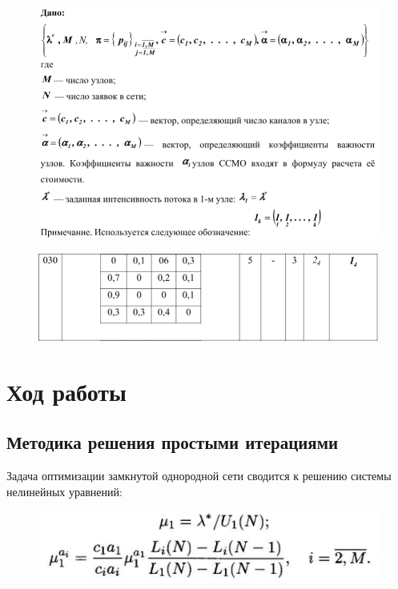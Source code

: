 \documentclass[14pt,a4paper,report]{report}
\begin{document}
\begin{figure}[h!]
	\centering
	\includegraphics[scale = 0.59]{images/2.png}
	\label{image:2}
\end{figure}

\begin{figure}[h!]
	\centering
	\includegraphics[scale = 0.59]{images/3.png}
	\label{image:3}
\end{figure}

\section{Ход работы}

\subsection{Методика решения простыми итерациями}

Задача оптимизации замкнутой однородной сети сводится к решению системы нелинейных уравнений:

\begin{figure}[h!]
	\centering
	\includegraphics[scale = 0.79]{images/4_r.png}
	\label{image:4r}
\end{figure}
\end{document}
